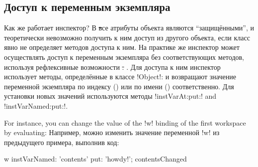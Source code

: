 \documentclass[a4paper,10pt,twoside]{book}
\begin{document}
\subsection{Доступ к переменным экземпляра}

Как же работает инспектор?
В \st все атрибуты объекта являются ``защищёнными'',
и теоретически невозможно получить к ним доступ из другого объекта, если класс явно не определяет методов доступа к ним.
На практике же инспектор может осуществлять доступ к переменным экземпляра без соответствующих методов, используя рефлексивные возможности \st.
.
Для доступа к ним инспектор использует методы, определённые в классе \ct!Object!:  и  возвращают значение переменной экземпляра по индексу () или по имени () соответственно. Для установки новых значений используются методы \ct!instVarAt:put:! and \ct!instVarNamed:put:!.

For instance, you can change the value of the \ct!w! binding of the first workspace by evaluating:
Например, можно изменить значение переменной \ct!w! из предыдущего примера, выполнив код:
\begin{code}{}
w instVarNamed: 'contents' put: 'howdy!'; contentsChanged
\end{code}

\end{document}

